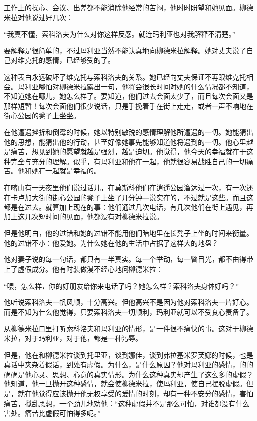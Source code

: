 工作上的操心、会议、出差都不能消除他经常的苦闷，他时时盼望和她见面。柳德米拉对他说过好几次：

“我真不懂，索科洛夫为什么对你这样反感。就连玛利亚也对我解释不清楚。”

要解释是很简单的，不过玛利亚当然不能认真地向柳德米拉解释。她对丈夫说了自己对维克托的感情，已经够受的了。

这种表白永远破坏了维克托与索科洛夫的关系。她已经向丈夫保证不再跟维克托相会。玛利亚哪怕对柳德米拉露出一句，他将会很长时间对她的什么情况都不知道，不知道她在哪儿，她怎么样了。要知道，他们过去会面太少了，而且每次会面又是那样短暂！每次会面他们很少说话，只是手挽着手在街上走走，或者一声不响地在街心公园的凳子上坐坐。

在他遭遇挫折和倒霉的时候，她以特别敏锐的感情理解他所遭遇的一切。她能猜出他的思想，能猜出他的行动，甚至好像她事先能够知道他将遇到的一切。他心里越是痛苦，想见到她的愿望就越是强烈，越是迫切。他觉得，他今天的幸福就在于这种完全与充分的理解。似乎，有玛利亚和他在一起，他就很容易战胜自己的一切痛苦。他和她在一起就是幸福的。

在喀山有一天夜里他们说过话儿，在莫斯科他们在逍遥公园溜达过一次，有一次还在卡卢加大街的街心公园的凳子上坐了几分钟—说实在的，不过就是这些。而且这都是在过去。就算加上现在的事：他们通过几次电话，有几次他们在街上遇见，再加上这几次短时间的见面，他都没有对柳德米拉说。

但是他明白，他的过错和她的过错不能用他们暗地里在长凳子上坐的时间来衡量。他的过错不小：他爱她。为什么她在他的生活中占据了这样大的地盘？

他对妻子说的每一句话，都只有一半真实。每一个举动，每一瞥目光，都不由得带上了虚假成分。他有时装做漫不经心地问柳德米拉：

“喂，怎么样，你的好朋友给你来电话了吗？她怎么样？索科洛夫身体好吗？”

他听说索科洛夫一帆风顺，十分高兴。但他高兴不是因为他对索科洛夫一片好心。而是不知为什么他觉得，只要索科洛夫一切顺利，玛利亚就可以不受良心责备了。

从柳德米拉口里打听索科洛夫和玛利亚的情形，是一件很不痛快的事。这对于柳德米拉，对于玛利亚，对于他，都是一种污辱。

但是，他在和柳德米拉谈到托里亚，谈到娜佳，谈到弗拉基米罗芙娜的时候，也是真话中夹杂着假话，到处有虚假。为什么，是什么原因？他对玛利亚的感情，的的确确是他心灵、思想、心意的真实情形。为什么这种真实却产生了这么多的虚假？他知道，他一旦抛开这种感情，就会使柳德米拉，使玛利亚，使自己摆脱虚假。但是，就在他觉得应该抛开他无权享受的爱情的时刻，却有一种不安分的感情，害怕痛苦，搅乱思想，一个劲儿地劝他：“这种虚假并不是那么可怕，对谁都没有什么害处。痛苦比虚假可怕得多呢。”


